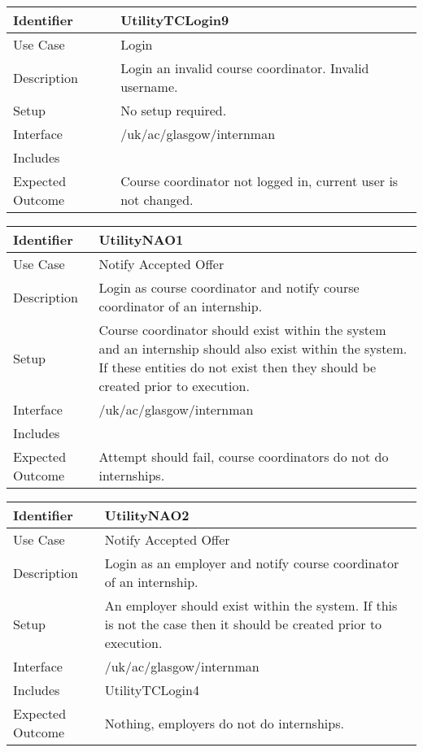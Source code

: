 \vspace{2em}

\begin{tabularx}{\textwidth}{|T|L|}
\hline
Identifier & UtilityTCLogin9\\
\hline
Use Case & Login \\
\hline
Description & Login an invalid course coordinator. Invalid username.\\
\hline
Setup & No setup required. \\
\hline
Interface & /uk/ac/glasgow/internman \\
\hline
Includes & \\
\hline
Expected Outcome & Course coordinator not logged in, current user is
not changed. \\
\hline
\end{tabularx}

\vspace{2em}

\begin{tabularx}{\textwidth}{|T|L|}
\hline
Identifier & UtilityNAO1\\
\hline
Use Case & Notify Accepted Offer \\
\hline
Description & Login as course coordinator and notify course
coordinator of an internship.\\
\hline
Setup & Course coordinator should exist within the system and an
internship should also exist within the system. If these entities do
not exist then they should be created prior to execution.\\
\hline
Interface & /uk/ac/glasgow/internman \\
\hline
Includes & \\
\hline
Expected Outcome & Attempt should fail, course coordinators do not do
internships.\\
\hline
\end{tabularx}

\vspace{2em}

\begin{tabularx}{\textwidth}{|T|L|}
\hline
Identifier & UtilityNAO2\\
\hline
Use Case & Notify Accepted Offer \\
\hline
Description & Login as an employer and notify course coordinator of an 
internship.\\
\hline
Setup & An employer should exist within the system. If this is not the
case then it should be created prior to execution. \\
\hline
Interface & /uk/ac/glasgow/internman \\
\hline
Includes & UtilityTCLogin4 \\
\hline
Expected Outcome & Nothing, employers do not do internships.\\
\hline
\end{tabularx}

